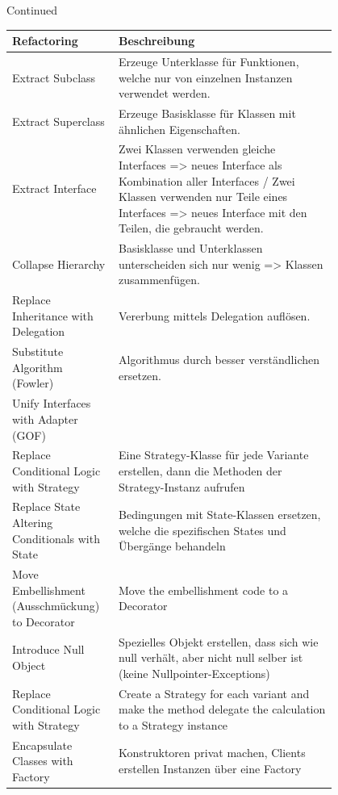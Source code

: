 \documentclass[a4paper, fontsize=6pt]{scrartcl}
\begin{document}
\begin{multicols*}{5}
 Continued
 
 \begin{tabular}{|p{0.2\linewidth}|p{0.6\linewidth}|}
 \hline
 Refactoring & Beschreibung \\ 
 \hline
 Extract Subclass & Erzeuge Unterklasse für Funktionen, welche nur von einzelnen Instanzen verwendet werden. \\ 
 \hline
 Extract Superclass & Erzeuge Basisklasse für Klassen mit ähnlichen Eigenschaften. \\ 
 \hline
 Extract Interface & Zwei Klassen verwenden gleiche Interfaces => neues Interface als Kombination aller Interfaces / Zwei Klassen verwenden nur Teile eines Interfaces => neues Interface mit den Teilen, die gebraucht werden. \\ 
 \hline
 Collapse Hierarchy & Basisklasse und Unterklassen unterscheiden sich nur wenig => Klassen zusammenfügen. \\ 
 \hline
 Replace Inheritance with Delegation & Vererbung mittels Delegation auflösen. \\ 
 \hline
 Substitute Algorithm (Fowler) & Algorithmus durch besser verständlichen ersetzen. \\ 
 \hline
 Unify Interfaces with Adapter (GOF) &  \\
 \hline
  Replace Conditional Logic with Strategy & Eine Strategy-Klasse für jede Variante erstellen, dann die Methoden der Strategy-Instanz aufrufen \\ 
  \hline
  Replace State Altering Conditionals with State & Bedingungen mit State-Klassen ersetzen, welche die spezifischen States und Übergänge behandeln\\
  \hline
  Move Embellishment (Ausschmückung) to Decorator & Move the embellishment code to a Decorator \\
  \hline
  Introduce Null Object & Spezielles Objekt erstellen, dass sich wie null verhält, aber nicht null selber ist (keine Nullpointer-Exceptions) \\ 
 \hline
  Replace Conditional Logic with Strategy & Create a Strategy for each variant and make the method delegate the calculation to a Strategy instance \\ 
 \hline
 Encapsulate Classes with Factory & Konstruktoren privat machen, Clients erstellen Instanzen über eine Factory  \\ 
 \hline
\end{tabular}


\end{multicols*}
\end{document}
